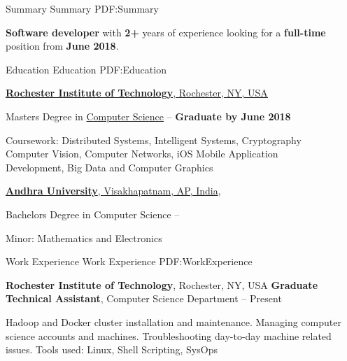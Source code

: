 \documentclass[letterpaper,MMMyyyy,nonstopmode]{simpleresumecv}
\begin{document}
\begin{Body}


\Section
{Summary}
{Summary}
{PDF:Summary}

\Entry
\textbf{Software developer} with \textbf{2+} years of experience looking for a \textbf{full-time} position from \textbf{June 2018}.


\Section
{Education}
{Education}
{PDF:Education}

\Entry
\href{https://www.rit.edu}
{\textbf{Rochester Institute of Technology}, \small{Rochester, NY, USA}}

\Gap
\BulletItem
Masters Degree in
\href{https://cs.rit.edu}
{Computer Science}
\hfill
{} --
\textbf{Graduate by June 2018}
\begin{Detail}
\SubBulletItem
Coursework:
Distributed Systems, Intelligent Systems, Cryptography\\Computer Vision, Computer Networks, iOS Mobile Application \\Development, Big Data and Computer Graphics
\end{Detail}



\BigGap
\Entry
\href{http://www.andhrauniversity.edu.in}
{\textbf{Andhra University}, \small{Visakhapatnam, AP, India}},

\Gap
\BulletItem
Bachelors Degree in Computer Science
\hfill
{} --
\begin{Detail}
\SubBulletItem
Minor:
Mathematics and Electronics
\end{Detail}


\Section
{Work Experience}
{Work Experience}
{PDF:WorkExperience}

\Entry
{\textbf{Rochester Institute of Technology}, \small{Rochester, NY, USA}}
\Gap
\BulletItem
\textbf{Graduate Technical Assistant}, Computer Science Department
\hfill
{} --
Present
\begin{Detail}
\SubBulletItem
Hadoop and Docker cluster installation and maintenance.
\SubBulletItem
Managing computer science accounts and machines.
\SubBulletItem
Troubleshooting day-to-day machine related issues.
\SubBulletItem
Tools used: Linux, Shell Scripting, SysOps
\end{Detail}


\end{Body}
\end{document}
